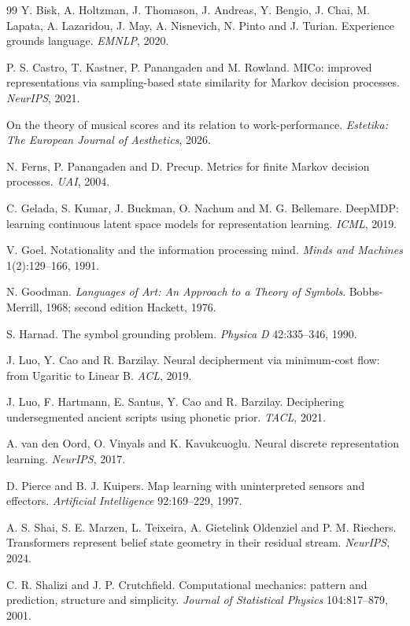 \begin{thebibliography}{99}
 Y. Bisk, A. Holtzman, J. Thomason, J. Andreas, Y. Bengio, J. Chai,
M. Lapata, A. Lazaridou, J. May, A. Nisnevich, N. Pinto and J. Turian. Experience grounds
language. \emph{EMNLP}, 2020.

 P. S. Castro, T. Kastner, P. Panangaden and M. Rowland. MICo:
improved representations via sampling-based state similarity for Markov decision
processes. \emph{NeurIPS}, 2021.

 On the theory of musical scores and its relation to
work-performance. \emph{Estetika: The European Journal of Aesthetics}, 2026.

 N. Ferns, P. Panangaden and D. Precup. Metrics for finite Markov
decision processes. \emph{UAI}, 2004.

 C. Gelada, S. Kumar, J. Buckman, O. Nachum and M. G. Bellemare.
DeepMDP: learning continuous latent space models for representation learning.
\emph{ICML}, 2019.

 V. Goel. Notationality and the information processing mind.
\emph{Minds and Machines} 1(2):129--166, 1991.

 N. Goodman. \emph{Languages of Art: An Approach to a Theory of
Symbols}. Bobbs-Merrill, 1968; second edition Hackett, 1976.

 S. Harnad. The symbol grounding problem. \emph{Physica D}
42:335--346, 1990.

 J. Luo, Y. Cao and R. Barzilay. Neural decipherment via minimum-cost
flow: from Ugaritic to Linear B. \emph{ACL}, 2019.

 J. Luo, F. Hartmann, E. Santus, Y. Cao and R. Barzilay. Deciphering
undersegmented ancient scripts using phonetic prior. \emph{TACL}, 2021.

 A. van den Oord, O. Vinyals and K. Kavukcuoglu. Neural discrete
representation learning. \emph{NeurIPS}, 2017.

 D. Pierce and B. J. Kuipers. Map learning with uninterpreted sensors
and effectors. \emph{Artificial Intelligence} 92:169--229, 1997.

 A. S. Shai, S. E. Marzen, L. Teixeira, A. Gietelink Oldenziel and
P. M. Riechers. Transformers represent belief state geometry in their residual stream.
\emph{NeurIPS}, 2024.

 C. R. Shalizi and J. P. Crutchfield. Computational mechanics:
pattern and prediction, structure and simplicity. \emph{Journal of Statistical Physics}
104:817--879, 2001.


\end{thebibliography}
